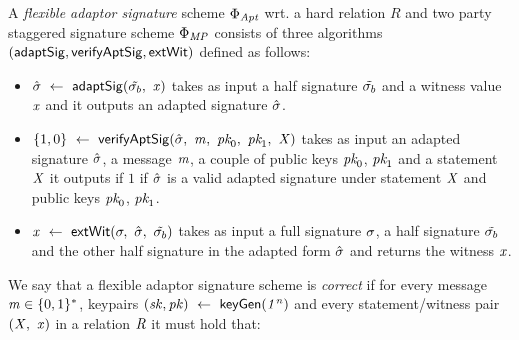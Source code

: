 \begin{definition}
A \emph{flexible adaptor signature} scheme $\Phi_{\mathit{Apt}}$ wrt. a hard relation $R$ and two party staggered signature scheme $\Phi_{\mathit{MP}}$ consists of three algorithms $(\mathsf{adaptSig}, \mathsf{verifyAptSig}, \mathsf{extWit})$ defined as follows:


\begin{itemize}
        \item $\hat{\sigma} ~\leftarrow~ \mathsf{adaptSig}(\tilde{\sigma_b} ,~ \mathit{x})$ takes as input a half signature $\tilde{\sigma_b}$ and a witness value $\mathit{x}$ and it outputs an adapted signature $\hat{\sigma}$. 
        \item $\{1,0\} ~\leftarrow~ \mathsf{verifyAptSig}(\hat{\sigma} ,~ \mathit{m} ,~ \textit{pk}_0 ,~ \textit{pk}_1 ,~ \mathit{X})$ takes as input an adapted signature $\hat{\sigma}$, a message $\mathit{m}$, a couple of public keys $\textit{pk}_0$, $\textit{pk}_1$ and a statement $\mathit{X}$ it outputs if $1$ if $\hat{\sigma}$ is a valid adapted signature under statement $\mathit{X}$ and public keys $\textit{pk}_0$, $\textit{pk}_1$. 
        \item $\mathit{x} ~\leftarrow~ \mathsf{extWit}(\sigma ,~ \hat{\sigma} ,~ \tilde{\sigma_b})$ takes as input a full signature $\sigma$, a half signature $\tilde{\sigma_b}$ and the other half signature in the adapted form $\hat{\sigma}$ and returns the witness $\mathit{x}$.
    \end{itemize}

\end{definition}




\begin{definition}
We say that a flexible adaptor signature scheme is \emph{correct} if for every message $\mathit{m} \in \{0,1\}^{*}$, keypairs $(\mathit{sk}, \mathit{pk}) ~\leftarrow~ \mathsf{keyGen}(\mathit{1^n})$ and every statement/witness pair $(\mathit{X} ,~ \mathit{x})$ in a relation $\mathit{R}$ it must hold that:

\end{definition}